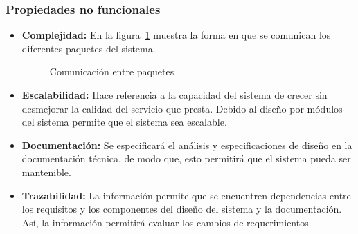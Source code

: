 	\subsubsection{Propiedades no funcionales}
		\begin{itemize}
			\item \textbf{Complejidad:}	En la figura~\ref{fig:vistalogica} muestra la forma en que se comunican los diferentes paquetes del sistema.
				
				\begin{figure}[htbp!]
					\begin{center}
						\caption{Comunicación entre paquetes}
						\label{fig:vistalogica}
					\end{center}
				\end{figure}
			
						
			\item \textbf{Escalabilidad:} Hace referencia a la capacidad del sistema de crecer sin desmejorar la calidad del servicio que presta. Debido al diseño por módulos del sistema permite que el sistema sea escalable.
			
			\item \textbf{Documentación:} Se especificará el análisis y especificaciones de diseño en la documentación técnica, de modo que, esto permitirá que el sistema pueda ser mantenible.
			
			\item \textbf{Trazabilidad:} La información permite que se encuentren dependencias entre los requisitos y los componentes del diseño del
			sistema y la documentación. Así, la información permitirá evaluar los cambios de requerimientos.
		\end{itemize}
	
